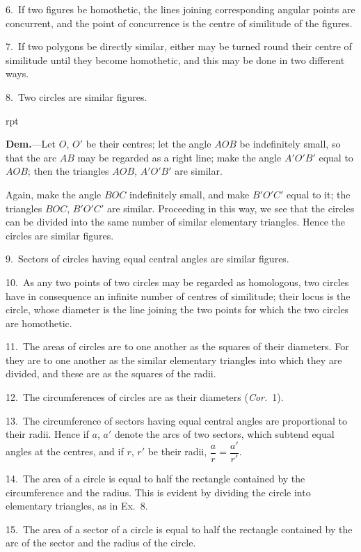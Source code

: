 \documentclass[oneside]{book}
\newcounter{wrapwidth}
\newcommand\imgflow[3]{
\setcounter{wrapwidth}{#1}

\begin{wrapfigure}[#2]{r}{\value{wrapwidth}pt}
\begin{center}
\vspace{-0.3in}

\end{center}
\end{wrapfigure}
}
\begin{document}
\smallskip
\begin{footnotesize}
6.~If two figures be homothetic, the lines joining corresponding
angular points are concurrent, and the point of concurrence is the
centre of similitude of the figures.

7.~If two polygons be directly similar, either may be turned
round their centre of similitude until they become homothetic,
and this may be done in two different ways.

8.~Two circles are similar figures.


\imgflow{235}{12}{f201}

\textbf{Dem.}---Let $O$, $O'$ be their centres; let the angle $AOB$ be
indefinitely
small, so that
the arc $AB$
may be regarded
as a
right line;
make the
angle $A'O'B'$
equal to $AOB$;
then the triangles
$AOB$,
$A'O'B'$ are similar.

Again, make the angle $BOC$ indefinitely small, and make $B'O'C'$
equal to it; the triangles $BOC$, $B'O'C'$ are similar. Proceeding
in this way, we see that the circles can be divided into the same
number of similar elementary triangles. Hence the circles are
similar figures.

9.~Sectors of circles having equal central angles are similar
figures.

10.~As any two points of two circles may be regarded as homologous,
two circles have in consequence an infinite number of
centres of similitude; their locus is the circle, whose diameter is
the line joining the two points for which the two circles are
homothetic.


11.~The areas of circles are to one another as the squares of
their diameters. For they are to one another as the similar
elementary triangles into which they are divided, and these are
as the squares of the radii.

12.~The circumferences of circles are as their diameters
(\textit{Cor.}~1).

13.~The circumference of sectors having equal central angles
are proportional to their radii. Hence if $a$, $a'$ denote the arcs of
two sectors, which subtend equal angles at the centres, and if
$r$, $r'$ be their radii, $\dfrac{a}{r} = \dfrac{a'}{r'}$.

14.~The area of a circle is equal to half the rectangle contained
by the circumference and the radius. This is evident by
dividing the circle into elementary triangles, as in Ex.~8.

15.~The area of a sector of a circle is equal to half the rectangle
contained by the arc of the sector and the radius of the
circle.
\par\end{footnotesize}
\end{document}
